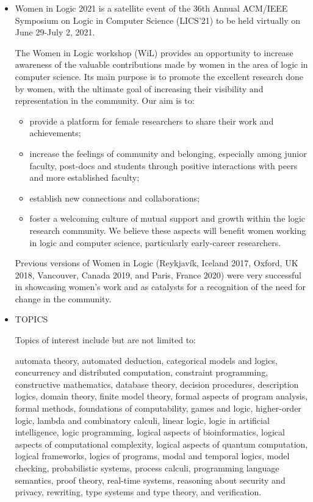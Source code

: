 \documentclass[prodmode,acmtecs]{acmsmall} %
\begin{document}
\begin{itemize}\item  Women in Logic 2021 is a satellite event of the 36th Annual ACM/IEEE  Symposium on Logic in Computer Science (LICS’21) to be held virtually  on June 29-July 2, 2021. 
 
  The Women in Logic workshop (WiL) provides an opportunity to increase awareness of the valuable contributions made by women in the area of logic in computer science. Its main purpose is to promote the excellent research done by women, with the ultimate goal of increasing their visibility and representation in the community. Our aim is to: 
 
\begin{itemize}\item  provide a platform for female researchers to share their work and achievements;
\item  increase the feelings of community and belonging, especially among junior faculty, post-docs and students through positive interactions with peers and more established faculty;
\item  establish new connections and collaborations;
\item  foster a welcoming culture of mutual support and growth within the logic research community. We believe these aspects will benefit women working in logic and computer science, particularly early-career researchers.
\end{itemize} 
  Previous versions of Women in Logic (Reykjavík, Iceland 2017, Oxford, UK 2018, Vancouver, Canada 2019, and Paris, France 2020)  were very successful in showcasing women's work and as catalysts for a  recognition of the need for change in the community. 
 
\item  TOPICS 
 
  Topics of interest include but are not limited to:  
 
  automata theory, automated deduction, categorical models and logics, concurrency and distributed computation, constraint programming, constructive mathematics, database theory, decision procedures, description logics, domain theory, finite model theory, formal aspects of program analysis, formal methods, foundations of computability, games and logic, higher-order logic, lambda and combinatory calculi, linear logic, logic in artificial intelligence, logic programming, logical aspects of bioinformatics, logical aspects of computational complexity, logical aspects of quantum computation, logical frameworks, logics of programs, modal and temporal logics, model checking, probabilistic systems, process calculi, programming language semantics, proof theory, real-time systems, reasoning about security and privacy, rewriting, type systems and type theory, and verification. 
 

\end{itemize}
\end{document}
